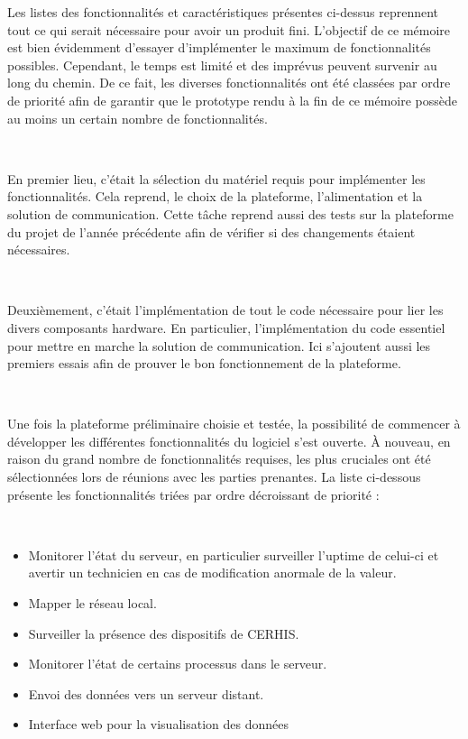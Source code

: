 \noindent
Les listes des fonctionnalités et caractéristiques présentes ci-dessus reprennent tout ce qui serait nécessaire pour avoir un produit fini. L'objectif de ce mémoire est bien évidemment d'essayer d'implémenter le maximum de fonctionnalités possibles. Cependant, le temps est limité et des imprévus peuvent survenir au long du chemin. De ce fait, les diverses fonctionnalités ont été classées par ordre de priorité afin de garantir que le prototype rendu à la fin de ce mémoire possède au moins un certain nombre de fonctionnalités.

~

\noindent
En premier lieu, c'était la sélection du matériel requis pour implémenter les fonctionnalités. Cela reprend, le choix de la plateforme, l'alimentation et la solution de communication. Cette tâche reprend aussi des tests sur la plateforme du projet de l'année précédente afin de vérifier si des changements étaient nécessaires.

~

\noindent
Deuxièmement, c'était l'implémentation de tout le code nécessaire pour lier les divers composants hardware. En particulier, l'implémentation du code essentiel pour mettre en marche la solution de communication. Ici s'ajoutent aussi les premiers essais afin de prouver le bon fonctionnement de la plateforme.

~

\noindent
Une fois la plateforme préliminaire choisie et testée, la possibilité de commencer à développer les différentes fonctionnalités du logiciel s'est ouverte. À nouveau, en raison du grand nombre de fonctionnalités requises, les plus cruciales ont été sélectionnées lors de réunions avec les parties prenantes. La liste ci-dessous présente les fonctionnalités triées par ordre décroissant de priorité :

~


\begin{itemize}
  \item Monitorer l'état du serveur, en particulier surveiller l'uptime de celui-ci et avertir un technicien en cas de modification anormale de la valeur.
  \item Mapper le réseau local.
  \item Surveiller la présence des dispositifs de CERHIS.
  \item Monitorer l'état de certains processus dans le serveur.
  \item Envoi des données vers un serveur distant.
  \item Interface web pour la visualisation des données
\end{itemize}

